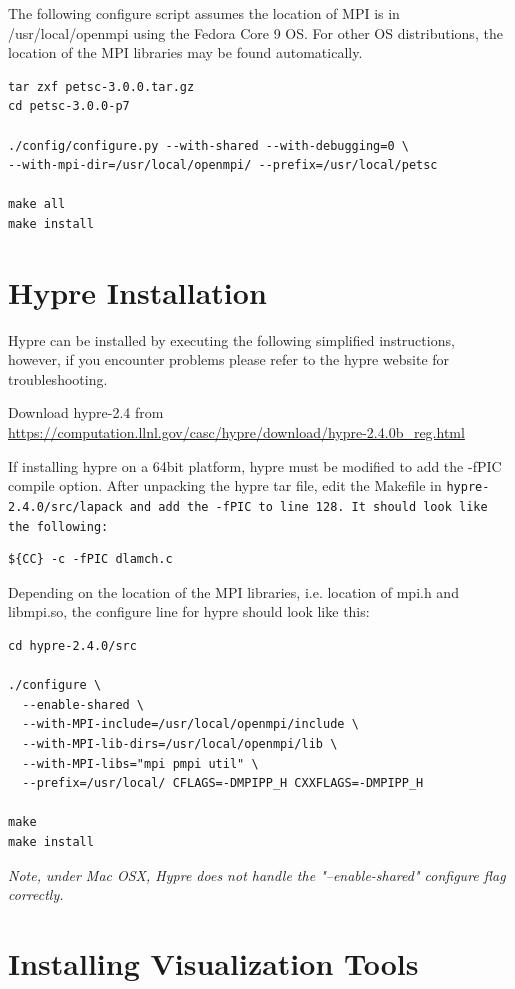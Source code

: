 \documentclass[12pt]{article}
\begin{document}
The following configure script assumes the location of MPI is in
/usr/local/openmpi using the Fedora Core 9 OS.  For other OS
distributions, the location of the MPI libraries may be found
automatically.

\begin{Verbatim}
tar zxf petsc-3.0.0.tar.gz
cd petsc-3.0.0-p7

./config/configure.py --with-shared --with-debugging=0 \ 
--with-mpi-dir=/usr/local/openmpi/ --prefix=/usr/local/petsc

make all
make install
\end{Verbatim}

\section{Hypre Installation}

Hypre can be installed by executing the following simplified
instructions, however, if you encounter problems please refer to the
hypre website for troubleshooting.

Download hypre-2.4 from
\url{https://computation.llnl.gov/casc/hypre/download/hypre-2.4.0b\_reg.html}

If installing hypre on a 64bit platform, hypre must be modified to add
the -fPIC compile option.  After unpacking the hypre tar file, edit
the Makefile in \tt hypre-2.4.0/src/lapack \normalfont and add the
-fPIC to line 128.  It should look like the following:

\begin{verbatim}
${CC} -c -fPIC dlamch.c
\end{verbatim}

Depending on the location of the MPI libraries, i.e. location of mpi.h
and libmpi.so, the configure line for hypre should look like this:
\begin{verbatim}
cd hypre-2.4.0/src

./configure \
  --enable-shared \
  --with-MPI-include=/usr/local/openmpi/include \
  --with-MPI-lib-dirs=/usr/local/openmpi/lib \
  --with-MPI-libs="mpi pmpi util" \
  --prefix=/usr/local/ CFLAGS=-DMPIPP_H CXXFLAGS=-DMPIPP_H

make
make install
\end{verbatim}

\emph{Note, under Mac OSX, Hypre does not handle the "--enable-shared" configure
  flag correctly.}

\section{Installing Visualization Tools}
\end{document}
